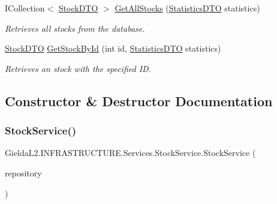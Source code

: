 \begin{DoxyCompactItemize}
I\+Collection$<$ \mbox{\hyperlink{class_gielda_l2_1_1_i_n_f_r_a_s_t_r_u_c_t_u_r_e_1_1_d_t_o_1_1_stock_d_t_o}{Stock\+D\+TO}} $>$ \mbox{\hyperlink{class_gielda_l2_1_1_i_n_f_r_a_s_t_r_u_c_t_u_r_e_1_1_services_1_1_stock_service_a1923e787cf70d1442d2108c064087202}{Get\+All\+Stocks}} (\mbox{\hyperlink{class_gielda_l2_1_1_i_n_f_r_a_s_t_r_u_c_t_u_r_e_1_1_d_t_o_1_1_statistics_d_t_o}{Statistics\+D\+TO}} statistics)
\begin{DoxyCompactList}\small\item\em Retrieves all stocks from the database. \end{DoxyCompactList}\item 
\mbox{\hyperlink{class_gielda_l2_1_1_i_n_f_r_a_s_t_r_u_c_t_u_r_e_1_1_d_t_o_1_1_stock_d_t_o}{Stock\+D\+TO}} \mbox{\hyperlink{class_gielda_l2_1_1_i_n_f_r_a_s_t_r_u_c_t_u_r_e_1_1_services_1_1_stock_service_ae8c734f66dfb438f446422df01ec994e}{Get\+Stock\+By\+Id}} (int id, \mbox{\hyperlink{class_gielda_l2_1_1_i_n_f_r_a_s_t_r_u_c_t_u_r_e_1_1_d_t_o_1_1_statistics_d_t_o}{Statistics\+D\+TO}} statistics)
\begin{DoxyCompactList}\small\item\em Retrieves an stock with the specified ID. \end{DoxyCompactList}\end{DoxyCompactItemize}


\subsection{Constructor \& Destructor Documentation}
\mbox{\label{class_gielda_l2_1_1_i_n_f_r_a_s_t_r_u_c_t_u_r_e_1_1_services_1_1_stock_service_a19aeb6c6d5729c8333bd37c3dfe41b2d}} 
\subsubsection{\texorpdfstring{StockService()}{StockService()}}
{\footnotesize\ttfamily Gielda\+L2.\+I\+N\+F\+R\+A\+S\+T\+R\+U\+C\+T\+U\+R\+E.\+Services.\+Stock\+Service.\+Stock\+Service (\begin{DoxyParamCaption}\item[{\mbox{\hyperlink{interface_gielda_l2_1_1_d_b_1_1_interfaces_1_1_i_stock_repository}{I\+Stock\+Repository}}}]{repository }\end{DoxyParamCaption})}



